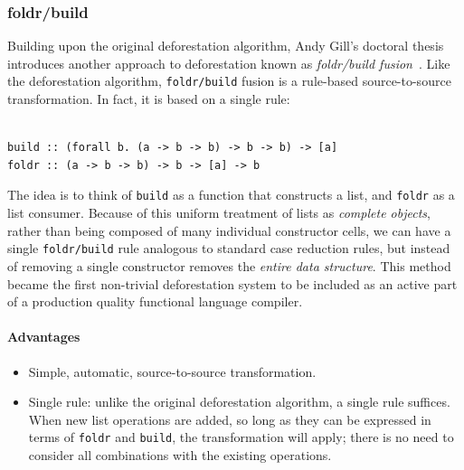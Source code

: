 \subsubsection{foldr/build}

Building upon the original deforestation algorithm, Andy Gill's doctoral thesis
introduces another approach to deforestation known as \emph{foldr/build
fusion}~\cite{Gill:1996tf,Gill:1993de}.
Like the deforestation algorithm, \texttt{foldr/build} fusion is a rule-based
source-to-source transformation. In fact, it is based on a single rule:
%
\begin{lstlisting}[style=Haskell,numbers=none,mathescape,caption={The \texttt{foldr/build} transformation}]
%\bf$\langle$ foldr/build fusion $\rangle$% forall g k z. foldr k z (build g) $\mapsto$ g k z

build :: (forall b. (a -> b -> b) -> b -> b) -> [a]
foldr :: (a -> b -> b) -> b -> [a] -> b
\end{lstlisting}

The idea is to think of \texttt{build} as a function that constructs a list, and
\texttt{foldr} as a list consumer. Because of this uniform treatment of lists as
\emph{complete objects}, rather than being composed of many individual
constructor cells, we can have a single \texttt{foldr/build} rule analogous to
standard case reduction rules, but instead of removing a single constructor
removes the \emph{entire data structure}. This method became the first
non-trivial deforestation system to be included as an active part of a
production quality functional language compiler.

\paragraph{Advantages}
\begin{itemize}
    \item Simple, automatic, source-to-source transformation.


    \item Single rule: unlike the original deforestation algorithm, a single
        rule suffices. When new list operations are added, so long as they can
        be expressed in terms of \texttt{foldr} and \texttt{build}, the
        transformation will apply; there is no need to consider all combinations
        with the existing operations.
\end{itemize}

